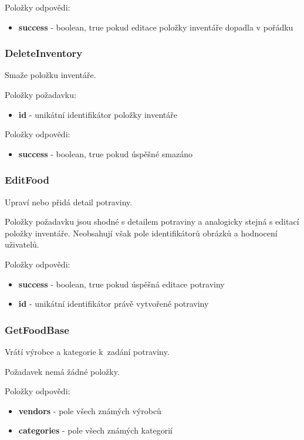 \documentclass[thesis=B,czech]{FITthesis}[2013/10/20]
\begin{document}
Položky odpovědi:
\begin{itemize}
  \item \textbf{success} - boolean, true pokud editace položky inventáře dopadla v pořádku
\end{itemize}

\subsubsection{DeleteInventory}
Smaže položku inventáře.

Položky požadavku:
\begin{itemize}
  \item \textbf{id} - unikátní identifikátor položky inventáře
\end{itemize}

Položky odpovědi:
\begin{itemize}
  \item \textbf{success} - boolean, true pokud úspěšné smazáno
\end{itemize}

\subsubsection{EditFood}
Upraví nebo přidá detail potraviny.

Položky požadavku jsou shodné s detailem potraviny a analogicky stejná s editací položky inventáře. Neobsahují však pole identifikátorů obrázků a hodnocení uživatelů.

Položky odpovědi:
\begin{itemize}
  \item \textbf{success} - boolean, true pokud úspěšná editace potraviny
  \item \textbf{id} - unikátní identifikátor právě vytvořené potraviny
\end{itemize}

\subsubsection{GetFoodBase}
Vrátí výrobce a kategorie k~zadání potraviny.

Požadavek nemá žádné položky.

Položky odpovědi:
\begin{itemize}
  \item \textbf{vendors} - pole všech známých výrobců
  \item \textbf{categories} - pole všech známých kategorií
\end{itemize}
\end{document}
